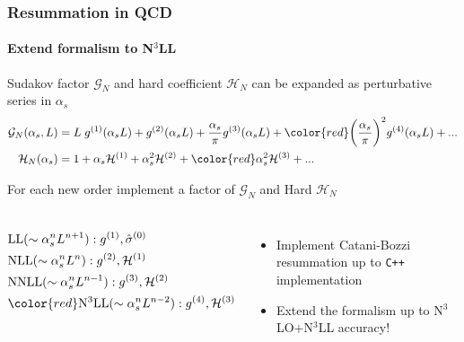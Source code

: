\documentclass[aspectratio=43]{beamer}
\begin{document}
\begin{frame}

	\frametitle{Resummation in QCD}
	\framesubtitle{Extend formalism to N$^{3}$LL}
	
	\footnotesize
	
	Sudakov factor $\mathcal{G}_{N}$ and hard coefficient $\mathcal{H}_{N}$ can be expanded as perturbative series in $\alpha_{s}$
	\begin{align}
		\mathcal{G}_{N}(\alpha_{s}, L) &= L\;g^{(1)}(\alpha_{s}L) + g^{(2)}(\alpha_{s}L) + \frac{\alpha_{s}}{\pi}g^{(3)}(\alpha_{s}L) + {\color{red} \bigg( \frac{\alpha_{s}}{\pi} \bigg) ^{2}g^{(4)}(\alpha_{s}L)} + ... \nonumber \\
		\mathcal{H}_{N}(\alpha_{s}) &= 1 + \alpha_{s}\mathcal{H}^{(1)} + \alpha_{s}^{2}\mathcal{H}^{(2)} + {\color{red}\alpha_{s}^{2}\mathcal{H}^{(3)}} + ...  \nonumber
	\end{align}
	
	For each new order implement a factor of $\mathcal{G}_{N}$ and Hard $\mathcal{H}_{N}$
	
	\begin{columns}
		
		
		\begin{align}
			&\textrm{LL} (\sim \alpha_{s}^{n}L^{n+1}): g^{(1)}, \hat{\sigma}^{(0)} \nonumber \\
			&\textrm{NLL} (\sim \alpha_{s}^{n}L^{n}): g^{(2)}, \mathcal{H}^{(1)} \nonumber \\
			&\textrm{NNLL} (\sim \alpha_{s}^{n}L^{n-1}): g^{(3)}, \mathcal{H}^{(2)} \nonumber \\
			&{\color{red} \textrm{N$^{3}$LL} (\sim \alpha_{s}^{n}L^{n-2}): g^{(4)}, \mathcal{H}^{(3)}} \nonumber
		\end{align}
		
		
		\begin{itemize}
			\item Implement Catani-Bozzi resummation up to \texttt{C++} implementation
			\item Extend the formalism up to {\color{red}N$^{3}$LO+N$^{3}$LL} accuracy!
		\end{itemize}
	
	\end{columns}

\end{frame}

%
%
\end{document}
